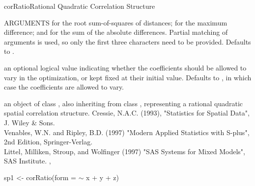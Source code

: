 \documentclass[pdftex]{article} \usepackage{url,graphicx}
\renewcommand{\Twiddle}{\mbox{\(\sim\)}}
\begin{document}
\begin{Helpfile}{corRatio}{Rational Quadratic Correlation Structure}
\begin{Argument}{ARGUMENTS}
 for the root sum-of-squares of distances;
 for the maximum difference; and 
for the sum of the absolute differences. Partial matching of
arguments is used, so only the first three characters need to be
provided. Defaults to .
\item[\Co{fixed:}]
an optional logical value indicating whether the
coefficients should be allowed to vary in the optimization, or kept
fixed at their initial value. Defaults to , in which case
the coefficients are allowed to vary.
\end{Argument}
an object of class , also inheriting from class
, representing a rational quadratic spatial correlation
structure.
Cressie, N.A.C. (1993), "Statistics for Spatial Data", J. Wiley \& Sons.\\
Venables, W.N. and Ripley, B.D. (1997) "Modern Applied Statistics with
S-plus", 2nd Edition, Springer-Verlag.\\
Littel, Milliken, Stroup, and Wolfinger (1997) "SAS Systems for Mixed
Models", SAS Institute.
, 
\need 15pt
\vspace{-16pt}
\begin{Example}
sp1 <- corRatio(form = {\Twiddle} x + y + z)
\end{Example}
\end{Helpfile}
\end{document}
